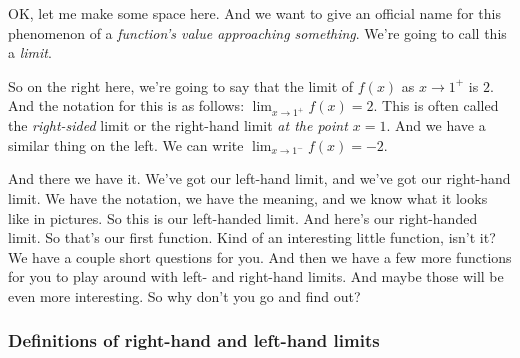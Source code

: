 \documentclass[pdftex, brazil, 12pt, twoside]{article}
\begin{document}
OK, let me make some space here.
And we want to give an official name
for this phenomenon of a \emph{function's value
approaching something}.
We're going to call this a \emph{limit}.

So on the right here, we're going
to say that the limit of $f(x)$ as $x \to 1^{+}$
is $2$.
And the notation for this is as follows:
$\displaystyle \lim_{x \to 1^{+}} f(x) = 2$.
This is often called the \emph{right-sided} limit
or the right-hand limit \emph{at the point $x = 1$}.
And we have a similar thing on the left.
We can write $\displaystyle \lim_{x \to 1^{-}} f(x) = -2$.

\begin{figure}[H]
  \begin{center}
    \label{fig:one-sided-limits-3}
  \end{center}
\end{figure}

And there we have it.
We've got our left-hand limit, and we've
got our right-hand limit.
We have the notation, we have the meaning,
and we know what it looks like in pictures.
So this is our left-handed limit.
And here's our right-handed limit.
So that's our first function.
Kind of an interesting little function, isn't it?
We have a couple short questions for you.
And then we have a few more functions for you
to play around with left- and right-hand limits.
And maybe those will be even more interesting.
So why don't you go and find out?

\subsubsection{Definitions of right-hand and left-hand limits}
\label{u0-intro-right-left}
\end{document}

